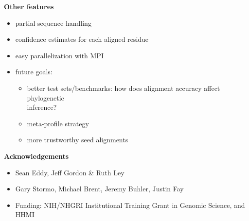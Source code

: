\documentclass[landscape]{slides}
\begin{document}
\begin{slide}
\begin{center}
\large
\textbf{Other features}
\end{center}

\small
\begin{itemize}
\item
partial sequence handling
\item
confidence estimates for each aligned residue
\item
easy parallelization with MPI
\item
future goals:
\begin{itemize}
\item
better test sets/benchmarks: how does alignment accuracy affect
phylogenetic \\ inference?
\item
meta-profile strategy
\item
more trustworthy seed alignments
\end{itemize}
\end{itemize}



\begin{center}
\large{\textbf{Acknowledgements}}
\end{center}


\begin{itemize}
\item
  Sean Eddy, Jeff Gordon \& Ruth Ley 
\item
  Gary Stormo, Michael Brent, Jeremy Buhler, Justin Fay 
\item
  Funding: NIH/NHGRI Institutional Training Grant in Genomic Science,
  and HHMI
\end{itemize}

\vfill
\end{slide}
\end{document}
